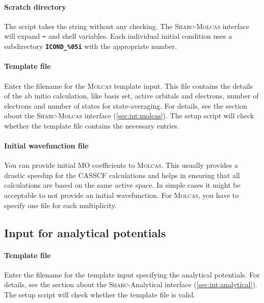 \documentclass[a4paper,11pt,DIV=15,openany,twoside=false]{scrbook}
\newcommand{\sharc}{\textsc{Sharc}}
\newcommand{\ttt}[1]{\textbf{\texttt{#1}}}
\begin{document}
\paragraph{Scratch directory}

The script takes the string without any checking. The \sharc-\textsc{Molcas} interface will expand \ttt{\textasciitilde} and shell variables. Each individual initial condition uses a subdirectory \ttt{ICOND\_\%05i} with the appropriate number. 

\paragraph{Template file}

Enter the filename for the \textsc{Molcas} template input. This file contains the details of the ab initio calculation, like basis set, active orbitals and electrons, number of electrons and number of states for state-averaging. For details, see the section about the \sharc-\textsc{Molcas} interface (\ref{sec:int:molcas}). The setup script will check whether the template file contains the necessary entries. 

\paragraph{Initial wavefunction file}

You can provide initial MO coefficients to \textsc{Molcas}. This usually provides a drastic speedup for the CASSCF calculations and helps in ensuring that all calculations are based on the same active space. In simple cases it might be acceptable to not provide an initial wavefunction. For \textsc{Molcas}, you have to specify one file for each multiplicity.



\subsection{Input for analytical potentials}\label{sec:setup_init.py:analytical}

\paragraph{Template file}

Enter the filename for the template input specifying the analytical potentials. For details, see the section about the \sharc-Analytical interface (\ref{sec:int:analytical}). The setup script will check whether the template file is valid. 
\end{document}
